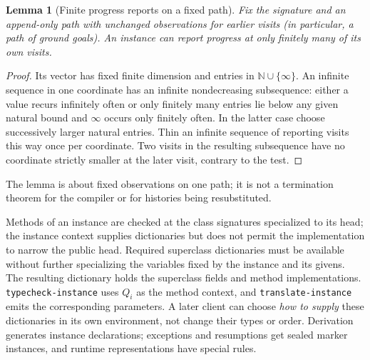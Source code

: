 \documentclass[11pt]{article}
\newtheorem{lemma}[theorem]{Lemma}
\theoremstyle{definition}
\newcommand{\src}[1]{\nolinkurl{#1}}
\begin{document}
\begin{lemma}[Finite progress reports on a fixed path]
Fix the signature and an append-only path with unchanged observations
for earlier visits (in particular, a path of ground goals). An instance
can report progress at only finitely many of its own visits.
\end{lemma}
\begin{proof}
Its vector has fixed finite dimension and entries in
$\mathbb N\cup\{\infty\}$. An infinite sequence in one coordinate
has an infinite nondecreasing subsequence: either a value recurs
infinitely often or only finitely many entries lie below any given
natural bound and $\infty$ occurs only finitely often. In the latter
case choose successively larger natural entries. Thin an infinite
sequence of reporting visits this way once per coordinate. Two visits
in the resulting subsequence have
no coordinate strictly smaller at the later visit, contrary to the test.
\end{proof}
The lemma is about fixed observations on one path; it is not a
termination theorem for the compiler or for histories being resubstituted.

Methods of an instance are checked at the class signatures specialized to
its head; the instance context supplies dictionaries but does not permit
the implementation to narrow the public head. Required superclass
dictionaries must be available without further specializing the variables
fixed by the instance and its givens. The resulting dictionary holds the
superclass fields and method implementations. \src{typecheck-instance}
uses $Q_i$ as the method context, and \src{translate-instance} emits the
corresponding parameters. A later client can choose \emph{how to supply}
these dictionaries in its own environment, not change their types or order.
Derivation generates instance declarations; exceptions and resumptions get
sealed marker instances, and runtime representations have special rules.
\end{document}
